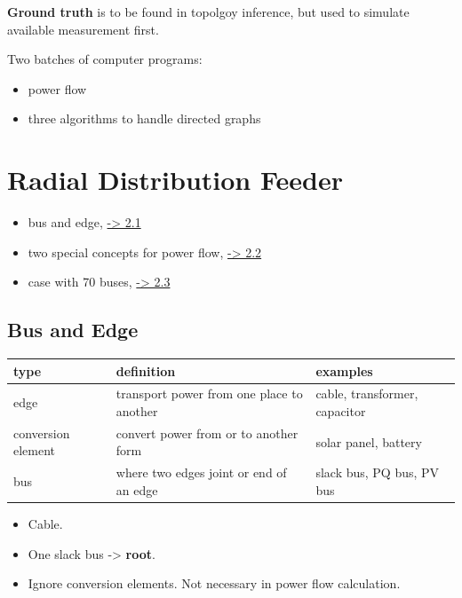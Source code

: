 \documentclass[
]{book}
\providecommand{\tightlist}{%
  \setlength{\itemsep}{0pt}\setlength{\parskip}{0pt}}
\begin{document}
\textbf{Ground truth} is to be found in topolgoy inference, but used to simulate
available measurement first.

Two batches of computer programs:

\begin{itemize}
\tightlist
\item
  power flow
\item
  three algorithms to handle directed graphs
\end{itemize}

\hypertarget{radial-distribution-feeder}{%
\chapter{Radial Distribution Feeder}\label{radial-distribution-feeder}}

\begin{itemize}
\tightlist
\item
  bus and edge, \protect\hyperlink{bus-edge}{-\textgreater{} 2.1}
\item
  two special concepts for power flow, \protect\hyperlink{concepts}{-\textgreater{} 2.2}
\item
  case with 70 buses, \protect\hyperlink{case}{-\textgreater{} 2.3}
\end{itemize}

\hypertarget{bus-edge}{%
\section{Bus and Edge}\label{bus-edge}}

\begin{table}[H]
\centering
\begin{tabular}[t]{l|l|l}
\hline
type & definition & examples\\
\hline
edge & transport power from one place to another & cable, transformer, capacitor\\
\hline
conversion element & convert power from or to another form & solar panel, battery\\
\hline
bus & where two edges joint or end of an edge & slack bus, PQ bus, PV bus\\
\hline
\end{tabular}
\end{table}

\begin{itemize}
\tightlist
\item
  Cable.
\item
  One slack bus -\textgreater{} \textbf{root}.
\item
  Ignore conversion elements. Not necessary in power flow calculation.
\end{itemize}
\end{document}
